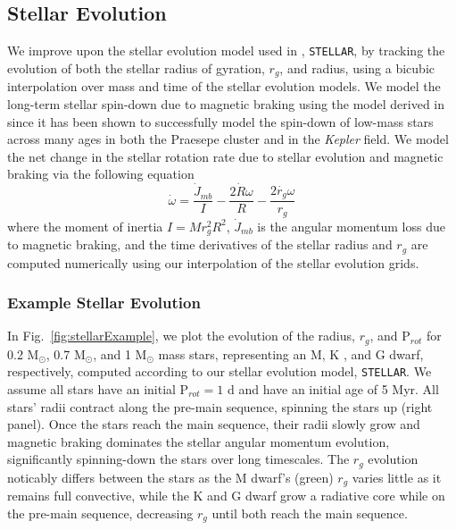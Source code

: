 \documentclass[twocolumn]{aastex61}
\newcommand{\stellar}[0]{\texttt{STELLAR}\xspace}
\newcommand{\kepler}[0]{\textit{Kepler}\xspace}
\begin{document}
\subsection{Stellar Evolution} \label{sec:methods:stellar}

We improve upon the stellar evolution model used in \citet{Fleming2018}, \stellar, by tracking the evolution of both the stellar radius of gyration, $r_g$, and radius, using a bicubic interpolation over mass and time of the \citet{Baraffe2015} stellar evolution models. We model the long-term stellar spin-down due to magnetic braking using the model derived in \citet{Matt2015} since it has been shown to successfully model the spin-down of low-mass stars across many ages in both the Praesepe cluster and in the \kepler field. We model the net change in the stellar rotation rate due to stellar evolution and magnetic braking via the following equation 
\begin{equation} \label{eqn:stellar_rot_rate_dt}
\dot{\omega} = \frac{\dot{J}_{mb}}{I} - \frac{2 \dot{R} \omega}{R} - \frac{2 \dot{r_g} \omega}{r_g}
\end{equation}
where the moment of inertia $I = M r_g^2 R^2$, $\dot{J}_{mb}$ is the angular momentum loss due to magnetic braking, and the time derivatives of the stellar radius and $r_g$ are computed numerically using our interpolation of the \citet{Baraffe2015} stellar evolution grids.  

\subsubsection{Example Stellar Evolution} \label{sec:methods:stellarExample}

In Fig.~\ref{fig:stellarExample}, we plot the evolution of the radius, $r_g$, and P$_{rot}$ for 0.2 M$_{\odot}$, 0.7 M$_{\odot}$, and 1 M$_{\odot}$ mass stars, representing an M, K , and G dwarf, respectively, computed according to our stellar evolution model, \stellar. We assume all stars have an initial P$_{rot} = 1$ d and have an initial age of 5 Myr. All stars' radii contract along the pre-main sequence, spinning the stars up (right panel). Once the stars reach the main sequence, their radii slowly grow and magnetic braking dominates the stellar angular momentum evolution, significantly spinning-down the stars over long timescales. The $r_g$ evolution noticably differs between the stars as the M dwarf's (green) $r_g$ varies little as it remains full convective, while the K and G dwarf grow a radiative core while on the pre-main sequence, decreasing $r_g$ until both reach the main sequence.
\end{document}
